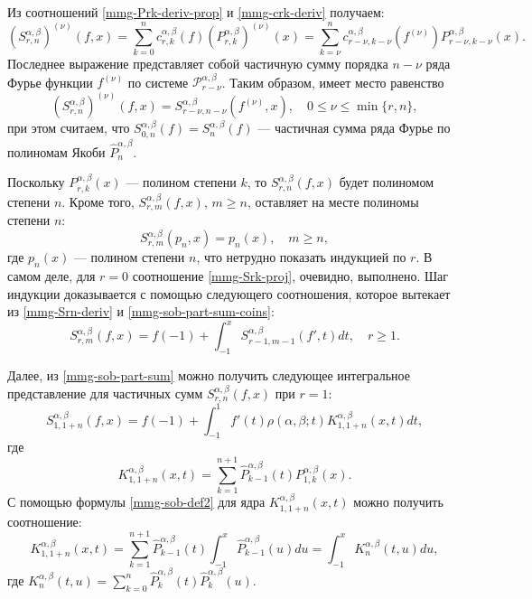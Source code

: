 Из соотношений \eqref{mmg-Prk-deriv-prop} и \eqref{mmg-crk-deriv} получаем:
\begin{equation*}
	(S^{\alpha,\beta}_{r,n})^{(\nu)}(f,x)=
	\sum_{k=0}^{n}c^{\alpha,\beta}_{r,k}(f)(P^{\alpha,\beta}_{r,k})^{(\nu)}(x)=
	\sum_{k=\nu}^{n}c^{\alpha,\beta}_{r-\nu,k-\nu}(f^{(\nu)})P^{\alpha,\beta}_{r-\nu,k-\nu}(x).
\end{equation*}
Последнее выражение представляет собой частичную сумму порядка $n-\nu$ ряда Фурье функции $f^{(\nu)}$ по системе $\mathcal{P}^{\alpha,\beta}_{r-\nu}$. Таким образом, имеет место равенство
\begin{equation}\label{mmg-Srn-deriv}
	(S^{\alpha,\beta}_{r,n})^{(\nu)}(f,x)=
	S^{\alpha,\beta}_{r-\nu,n-\nu}(f^{(\nu)},x), \quad 0 \le \nu \le \min\{r,n\},
\end{equation}
при этом считаем, что $S^{\alpha,\beta}_{0,n}(f)=S^{\alpha,\beta}_n(f)$ --- частичная сумма ряда Фурье по полиномам Якоби $\hat{P}^{\alpha,\beta}_n$.

Поскольку $P^{\alpha,\beta}_{r,k}(x)$ --- полином степени $k$, то $S^{\alpha,\beta}_{r,n}(f,x)$ будет полиномом степени $n$. Кроме того, $S^{\alpha,\beta}_{r,m}(f,x)$, $m \ge n$, оставляет на месте полиномы степени $n$:
\begin{equation}\label{mmg-Srk-proj}
	S^{\alpha,\beta}_{r,m}(p_n,x)=p_n(x), \quad m \ge n,
\end{equation}
где $p_n(x)$ --- полином степени $n$, что нетрудно показать индукцией по $r$. В самом деле, для $r=0$ соотношение \eqref{mmg-Srk-proj}, очевидно, выполнено. Шаг индукции доказывается с помощью следующего соотношения, которое вытекает из \eqref{mmg-Srn-deriv} и \eqref{mmg-sob-part-sum-coins}:
\begin{equation}\label{mmg-Srn-int-1}
	S^{\alpha,\beta}_{r,m}(f,x)=f(-1)+\int_{-1}^x S^{\alpha,\beta}_{r-1,m-1}(f',t)dt, \quad r \ge 1.
\end{equation}

Далее, из \eqref{mmg-sob-part-sum} можно получить следующее интегральное представление для частичных сумм $S^{\alpha,\beta}_{r,n}(f,x)$ при $r=1$:
\begin{equation}\label{mmg-S1n-int-repr}
	S^{\alpha,\beta}_{1,1+n}(f,x) = f(-1)+\int_{-1}^{1}f'(t)\rho(\alpha, \beta; t)K^{\alpha,\beta}_{1,1+n}(x,t)dt,
\end{equation}
где
\begin{equation*}
	K^{\alpha,\beta}_{1,1+n}(x,t)=\sum_{k=1}^{n+1}\hat{P}^{\alpha,\beta}_{k-1}(t)P^{\alpha,\beta}_{1,k}(x).
\end{equation*}
С помощью формулы \eqref{mmg-sob-def2} для ядра $K^{\alpha,\beta}_{1,1+n}(x,t)$ можно получить соотношение:
\begin{equation}\label{mmg-K1n-Kn-repr}
	K^{\alpha,\beta}_{1,1+n}(x,t)=\sum_{k=1}^{n+1}\hat{P}^{\alpha,\beta}_{k-1}(t)\int_{-1}^{x}\hat{P}^{\alpha,\beta}_{k-1}(u)du=\int_{-1}^{x}K^{\alpha,\beta}_n(t,u)du,
\end{equation}
где $K^{\alpha,\beta}_n(t,u)=\sum_{k=0}^{n}\hat{P}^{\alpha,\beta}_{k}(t)\hat{P}^{\alpha,\beta}_{k}(u)$.

